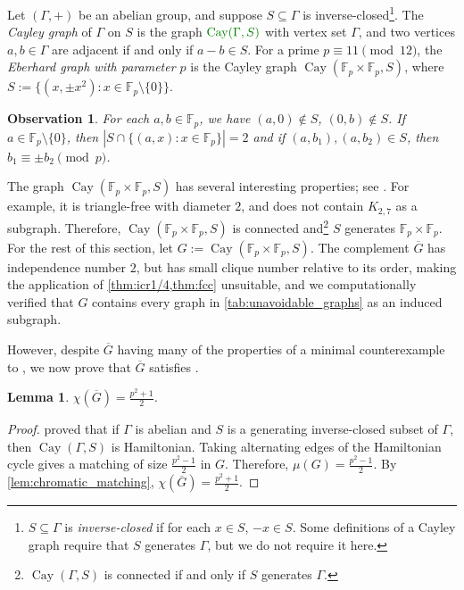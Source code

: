 \documentclass[11pt]{article}
\numberwithin{equation}{section}
\theoremstyle{plain}
\newtheorem{lem}[equation]{Lemma}
\newtheorem{obs}[equation]{Observation}
\theoremstyle{definition}
\newcommand{\F}{\mathbb{F}}
\DeclareMathOperator{\Cay}{Cay}
\newcommand{\defn}[1]{\textcolor{green!50!black}{\textit{#1}}}
\newcommand{\mathdefn}[1]{\textcolor{green!50!black}{#1}}
\begin{document}
Let $(\Gamma, +)$ be an abelian group, and suppose $S \subseteq \Gamma$ is inverse-closed\footnote{$S \subseteq \Gamma$ is \defn{inverse-closed} if for each $x \in S$, $-x \in S$. Some definitions of a Cayley graph require that $S$ generates $\Gamma$, but we do not require it here.}. The \defn{Cayley graph} of $\Gamma$ on $S$ is the graph $\mathdefn{\Cay(\Gamma, S)}$ with vertex set $\Gamma$, and two vertices $a,b \in \Gamma$ are adjacent if and only if $a - b \in S$. For a prime $p \equiv 11 \pmod{12}$, the \defn{Eberhard graph with parameter $p$} is the Cayley graph $\Cay(\F_p \times \F_p, S)$, where $S:= \{ (x, \pm x^2): x \in \F_p \setminus \{0\} \}$.
\begin{obs}
    \label{obs:cay}
    For each $a, b \in \F_p$, we have $(a,0) \notin S$, $(0,b) \notin S$. If $a \in \F_p \setminus \{0\}$, then $|S \cap \{(a, x) : x \in \F_p\} | = 2$ and if $(a,b_1), (a,b_2) \in S$, then $b_1 \equiv \pm b_2 \pmod{p}$.
\end{obs}
The graph $\Cay(\F_p \times \F_p, S)$ has several interesting properties; see \citep{ETT25}. For example, it is triangle-free with diameter $2$, and does not contain $K_{2,7}$ as a subgraph. Therefore, $\Cay(\F_p \times \F_p, S)$ is connected and\footnote{$\Cay(\Gamma, S)$ is connected if and only if $S$ generates $\Gamma$.} $S$ generates $\F_p \times \F_p$. For the rest of this section, let $G:=\Cay(\F_p \times \F_p, S)$. The complement $\overline{G}$ has independence number $2$, but has small clique number relative to its order, making the application of \cref{thm:icr1/4,thm:fcc} unsuitable, and we computationally verified that $G$ contains every graph in \cref{tab:unavoidable_graphs} as an induced subgraph.

However, despite $\overline{G}$ having many of the properties of a minimal counterexample to , we now prove that $\overline{G}$ satisfies .

\begin{lem}
    \label{lem:chromatic_ebhard}
    $\chi(\overline{G}) = \frac{p^2+1}{2}$.
\end{lem}
\begin{proof}
    \citet{stelow2017hamiltonicity} proved that if $\Gamma$ is abelian and $S$ is a generating inverse-closed subset of $\Gamma$, then $\Cay(\Gamma, S)$ is Hamiltonian. Taking alternating edges of the Hamiltonian cycle gives a matching of size $\frac{p^2 - 1}{2} $ in $G$. Therefore, $\mu(G) = \frac{p^2 - 1}{2} $. By \cref{lem:chromatic_matching},  $\chi(\overline{G}) = \frac{p^2+1}{2}$.
\end{proof}
\end{document}
